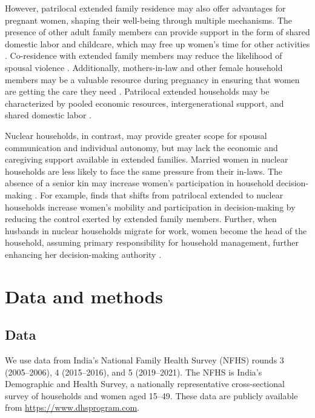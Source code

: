 \documentclass[12pt]{article}
\begin{document}
However, patrilocal extended family residence may also offer advantages for pregnant women, shaping their well-being through multiple mechanisms.  The presence of other adult family members can provide support in the form of shared domestic labor and childcare, which may free up women’s time for other activities \citep{khanna2024role}. Co-residence with extended family members may reduce the likelihood of spousal violence \citep{khanna2024role, khalil2019patrilocal, allendorf2013going}. Additionally, mothers-in-law and other female household members may be a valuable resource during pregnancy in ensuring that women are getting the care they need \citep{varghese2019coresidence}.  Patrilocal extended households may be characterized by pooled economic resources, intergenerational support, and shared domestic labor \citep{wadley1988karimpur}.  

Nuclear households, in contrast, may provide greater scope for spousal communication and individual autonomy, but may lack the economic and caregiving support available in extended families. Married women in nuclear households are less likely to face the same pressure from their in-laws. The absence of a senior kin may increase women’s participation in household decision-making \citep{simkhada2010role,char2010influence}. For example, \cite{mookerjee2019gender} finds that shifts from patrilocal extended to nuclear households increase women’s mobility and participation in decision-making by reducing the control exerted by extended family members. Further, when husbands in nuclear households migrate for work, women become the head of the household, assuming primary responsibility for  household management, further enhancing her decision-making authority \citep{desai2008negotiated}. 

\section*{Data and methods}\label{sec:data_and_methods} %

\subsection*{Data} \label{sec:data}

We use data from India’s National Family Health Survey (NFHS) rounds 3 (2005–2006), 4 (2015–2016), and 5 (2019–2021). The NFHS is India’s Demographic and Health Survey, a nationally representative cross-sectional survey of households and women aged 15–49. These data are publicly available from \url{https://www.dhsprogram.com}.
\end{document}
